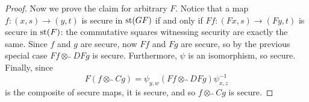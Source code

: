 \begin{proof}
  Now we prove the claim for arbitrary $F$. Notice that a map $f: (x, s)\to
  (y, t)$ is secure in $\operatorname*{st}(GF)$ if and only if $Ff: (Fx, s)\to (Fy, t)$ is
  secure in $\operatorname*{st}(F)$: the commutative squares witnessing security are
  exactly the same. Since $f$ and $g$ are secure, now $Ff$ and $Fg$ are secure,
  so by the previous special case $Ff\otimes_\cat{D} Fg$ is secure. Furthermore,
  $\psi$ is an isomorphism, so secure. Finally, since
  \[
    F(f\otimes_\cat{C} g) = \psi_{y,w}(Ff\otimes_\cat{D} Fg)\psi^{-1}_{x,z}
  \] is the composite of secure maps, it is secure, and so $f\otimes_\cat{C} g$
  is secure.
\end{proof}


